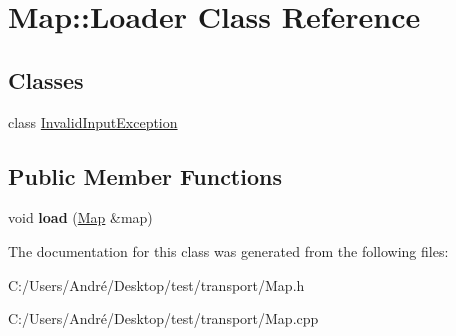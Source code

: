 \hypertarget{class_map_1_1_loader}{}\section{Map\+:\+:Loader Class Reference}
\label{class_map_1_1_loader}
\subsection*{Classes}
\begin{DoxyCompactItemize}
\item 
class \hyperlink{class_map_1_1_loader_1_1_invalid_input_exception}{Invalid\+Input\+Exception}
\end{DoxyCompactItemize}
\subsection*{Public Member Functions}
\begin{DoxyCompactItemize}
\item 
\hypertarget{class_map_1_1_loader_a2cd5aceed982a568149fffb0e3786215}{}void {\bfseries load} (\hyperlink{class_map}{Map} \&map)\label{class_map_1_1_loader_a2cd5aceed982a568149fffb0e3786215}

\end{DoxyCompactItemize}


The documentation for this class was generated from the following files\+:\begin{DoxyCompactItemize}
\item 
C\+:/\+Users/\+André/\+Desktop/test/transport/Map.\+h\item 
C\+:/\+Users/\+André/\+Desktop/test/transport/Map.\+cpp\end{DoxyCompactItemize}
